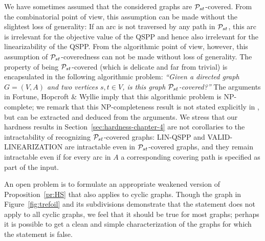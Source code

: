 We have sometimes assumed that the considered graphs are ${\cal P}_{st}$-covered.
From the combinatorial point of view, this assumption can be made without the slightest loss 
of generality: If an arc is not traversed by any path in ${\cal P}_{st}$, this arc is irrelevant for 
the objective value of the QSPP and hence also irrelevant for the linearizability of the QSPP.
From the algorithmic point of view, however, this assumption of ${\cal P}_{st}$-coveredness can not be 
made without loss of generality.
The property of being ${\cal P}_{st}$-covered (which is delicate and far from trivial) is encapsulated
in the following algorithmic problem:
\emph{``Given a directed graph $G=(V,A)$ and two vertices $s,t\in V$, is this graph ${\cal P}_{st}$-covered?''}
The arguments in Fortune, Hopcroft \& Wyllie \cite{FoHoWy1980} imply that this algorithmic
problem is NP-complete; we remark that this NP-completeness result is not stated explicitly in
\cite{FoHoWy1980}, but can be extracted and deduced from the arguments.
We stress that our hardness results in Section~\ref{sec:hardness-chapter-4} are not corollaries to the 
intractability of recognizing ${\cal P}_{st}$-covered graphs: LIN-QSPP and VALID-LINEARIZATION 
are intractable even in ${\cal P}_{st}$-covered graphs, and they remain intractable even if for every 
arc in $A$ a corresponding covering path is specified as part of the input.

An open problem is to formulate an appropriate weakened version of Proposition~\ref{pr:HS} 
that also applies to cyclic graphs.
Though the graph in Figure~\ref{fig:trefoil} and its subdivisions demonstrate that the 
statement does not apply to all cyclic graphs, we feel that it should be true for most graphs; 
perhaps it is possible to get a clean and simple characterization of the graphs for which the
statement is false.

